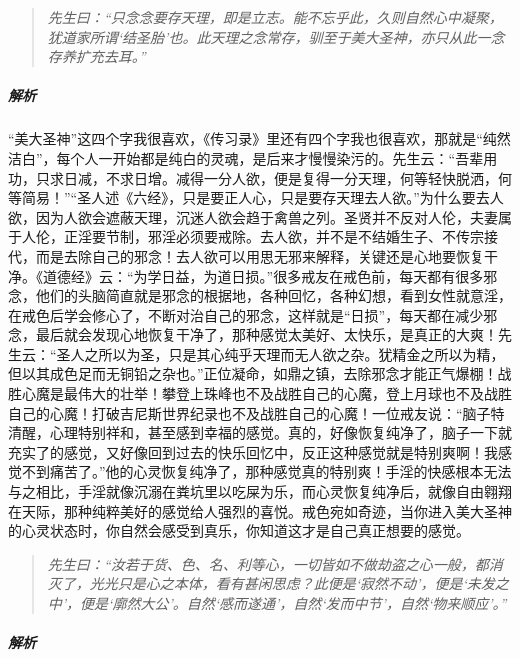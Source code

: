 \begin{quote}\it
    先生曰：“只念念要存天理，即是立志。能不忘乎此，久则自然心中凝聚，犹道家所谓‘结圣胎’也。此天理之念常存，驯至于美大圣神，亦只从此一念存养扩充去耳。”
\end{quote}

\subparagraph{解析}

“美大圣神”这四个字我很喜欢，《传习录》里还有四个字我也很喜欢，那就是“纯然洁白”，每个人一开始都是纯白的灵魂，是后来才慢慢染污的。先生云：“吾辈用功，只求日减，不求日增。减得一分人欲，便是复得一分天理，何等轻快脱洒，何等简易！”“圣人述《六经》，只是要正人心，只是要存天理去人欲。”为什么要去人欲，因为人欲会遮蔽天理，沉迷人欲会趋于禽兽之列。圣贤并不反对人伦，夫妻属于人伦，正淫要节制，邪淫必须要戒除。去人欲，并不是不结婚生子、不传宗接代，而是去除自己的邪念！去人欲可以用思无邪来解释，关键还是心地要恢复干净。《道德经》云：“为学日益，为道日损。”很多戒友在戒色前，每天都有很多邪念，他们的头脑简直就是邪念的根据地，各种回忆，各种幻想，看到女性就意淫，在戒色后学会修心了，不断对治自己的邪念，这样就是“日损”，每天都在减少邪念，最后就会发现心地恢复干净了，那种感觉太美好、太快乐，是真正的大爽！先生云：“圣人之所以为圣，只是其心纯乎天理而无人欲之杂。犹精金之所以为精，但以其成色足而无铜铅之杂也。”正位凝命，如鼎之镇，去除邪念才能正气爆棚！战胜心魔是最伟大的壮举！攀登上珠峰也不及战胜自己的心魔，登上月球也不及战胜自己的心魔！打破吉尼斯世界纪录也不及战胜自己的心魔！一位戒友说：“脑子特清醒，心理特别祥和，甚至感到幸福的感觉。真的，好像恢复纯净了，脑子一下就充实了的感觉，又好像回到过去的快乐回忆中，反正这种感觉就是特别爽啊！我感觉不到痛苦了。”他的心灵恢复纯净了，那种感觉真的特别爽！手淫的快感根本无法与之相比，手淫就像沉溺在粪坑里以吃屎为乐，而心灵恢复纯净后，就像自由翱翔在天际，那种纯粹美好的感觉给人强烈的喜悦。戒色宛如奇迹，当你进入美大圣神的心灵状态时，你自然会感受到真乐，你知道这才是自己真正想要的感觉。

\begin{quote}\it
    先生曰：“汝若于货、色、名、利等心，一切皆如不做劫盗之心一般，都消灭了，光光只是心之本体，看有甚闲思虑？此便是‘寂然不动’，便是‘未发之中’，便是‘廓然大公’。自然‘感而遂通’，自然‘发而中节’，自然‘物来顺应’。”
\end{quote}

\subparagraph{解析}

